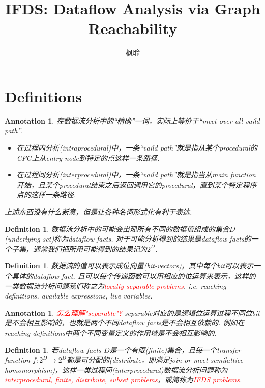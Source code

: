 \documentclass{article}
\newtheorem{definition}[theorem]{Definition}
\newtheorem{annotation}[theorem]{Annotation}
\newcommand*{\xfunc}[4]{{#2}\colon{#3}{#1}{#4}}
\newcommand*{\func}[3]{\xfunc{\to}{#1}{#2}{#3}}
\newcommand{\redt}[1]{\textcolor{red}{#1}}
\begin{document}
\title{IFDS: Dataflow Analysis via Graph Reachability}
\author{枫聆}
\maketitle
\tableofcontents

\newpage
\section{Definitions}


\begin{annotation}
\rm 在数据流分析中的“精确”一词，实际上等价于“meet over all vaild path”. 
\begin{itemize}
	\item 在过程内分析(intraprocedural)中，一条“vaild path”就是指从某个procedural的CFG上从entry node到特定的点这样一条路径. 
	\item 在过程间分析(interprocedural)中，一条“vaild path”就是指当从main function开始，且某个procedural结束之后返回调用它的procedural，直到某个特定程序点的这样一条路径.  
\end{itemize}
上述东西没有什么新意，但是让各种名词形式化有利于表达. 
\end{annotation}

\begin{definition}
\rm 数据流分析中的可能会出现所有不同的数据值组成的集合$D$(underlying set)称为dataflow facts. 对于可能分析得到的结果是dataflow facts的一个子集，通常我们把所用可能得到的结果记为$2^D$. 
\end{definition}

\begin{definition}
\rm 数据流的值可以表示成位向量(bit-vectors)，其中每个bit可以表示一个具体的dataflow fact, 且可以每个传递函数可以用相应的位运算来表示，这样的一类数据流分析问题我们称之为\redt{locally separable problems}. i.e. reaching-definitions, available expressions, live variables. 
\end{definition}

\begin{annotation}
\rm \redt{怎么理解"separable"?} separable对应的是逻辑位运算过程不同位bit是不会相互影响的，也就是两个不同dataflow facts是不会相互依赖的. 例如在reaching-definitions中两个不同变量定义的作用域是不会相互影响的.   
\end{annotation}


\begin{definition}
\rm 若dataflow facts $D$是一个有限(finite)集合，且每一个transfer function $\func{f}{2^D}{2^D}$都是可分配的(distribute，即满足join or meet semilattice homomorphism)，这样一类过程间(interprocedural)数据流分析问题称为\redt{interprocedural, finite, distribute, subset problems}，或简称为\redt{IFDS problems}.
\end{definition}
\end{document}
